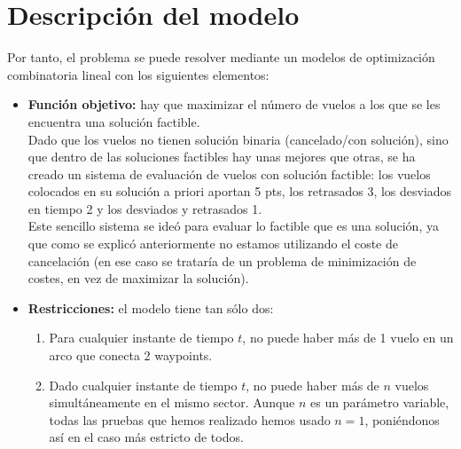 \section{Descripción del modelo}
Por tanto, el problema se puede resolver mediante un modelos de optimización combinatoria lineal con los siguientes elementos:
\begin{itemize}
	\item \textbf{Función objetivo: }hay que maximizar el número de vuelos a los que se les encuentra una solución factible.\\
	 Dado que los vuelos no tienen solución binaria (cancelado/con solución), sino que dentro de las soluciones factibles hay unas mejores que otras, se ha creado un sistema de evaluación de vuelos con solución factible: los vuelos colocados en su solución a priori aportan 5 pts, los retrasados 3, los desviados en tiempo 2 y los desviados y retrasados 1.\\
	 Este sencillo sistema se ideó para evaluar lo factible que es una solución, ya que como se explicó anteriormente no estamos utilizando el coste de cancelación (en ese caso se trataría de un problema de minimización de costes, en vez de maximizar la solución).
	\item \textbf{Restricciones:} el modelo tiene tan sólo dos:
	\begin{enumerate}
		\item Para cualquier instante de tiempo $t$, no puede haber más de 1 vuelo en un arco que conecta 2 waypoints. 
		\item Dado cualquier instante de tiempo $t$, no puede haber más de $n$ vuelos simultáneamente en el mismo sector. Aunque $n$ es un parámetro variable, todas las pruebas que hemos realizado hemos usado $n=1$, poniéndonos así en el caso más estricto de todos.
	\end{enumerate}
\end{itemize}

